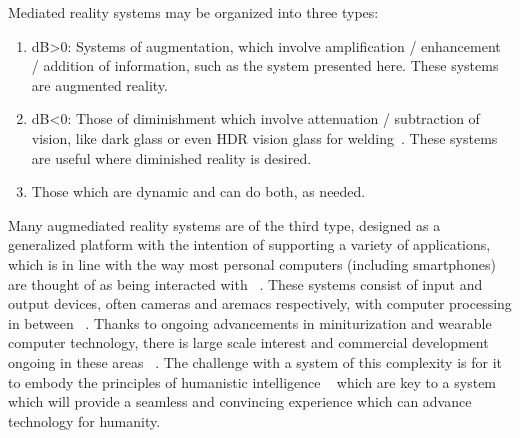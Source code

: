 \documentclass{sigchi-ext}
\begin{document}
Mediated reality systems may be organized into three types:
\begin{enumerate}
\item dB\textgreater  0: Systems of augmentation, which involve amplification / enhancement / addition of information, such as the system presented here. These systems are augmented reality.
\item dB\textless  0: Those of diminishment which involve
attenuation / subtraction of vision, like dark glass or even
HDR vision glass for welding~\cite{mannHDR}.
These systems are useful where diminished reality is desired.
\item Those which are dynamic and can do both, as needed.
\end{enumerate}

Many augmediated reality systems are of the third type, designed as a
generalized platform with the intention of supporting a variety of
applications, which is in line with the way most personal computers (including
smartphones) are thought of as being interacted with ~\cite{arsurvey}. These
systems consist of input and output devices, often cameras and aremacs
respectively, with computer processing in between ~\cite{mann2012realtime}.
Thanks to ongoing advancements in miniturization and wearable computer
technology, there is large scale interest and commercial development ongoing in
these areas ~\cite{mann1998wearable}. The challenge with a system of this
complexity is for it to embody the principles of humanistic intelligence
~\cite{mann1998humanistic} which are key to a system which will provide a
seamless and convincing experience which can advance technology for
humanity.~\cite{mann2001wearable}
\end{document}
